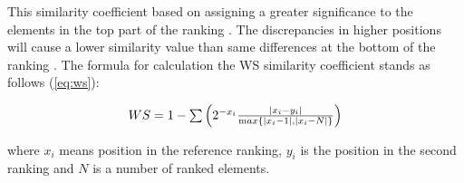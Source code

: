 This similarity coefficient based on assigning a greater significance to the elements in the top part of the ranking \cite{salabun2020new}. The discrepancies in higher positions will cause a lower similarity value than same differences at the bottom of the ranking \cite{paradowski2021similarity}. The formula for calculation the WS similarity coefficient stands as follows (\ref{eq:ws}):

\begin{equation}
\begin{array}{lcl}
WS = 1 - \sum \left ( 2^{-x_{i}} \frac{| x_{i} - y_{i} |}{\text max \{|x_{i}-1|, |x_{i}-N|\} } \right )
\end{array}
\label{eq:ws}
\end{equation}

where $x_i$ means position in the reference ranking, $y_i$ is the position in the second ranking and $N$ is a number of ranked elements. \\